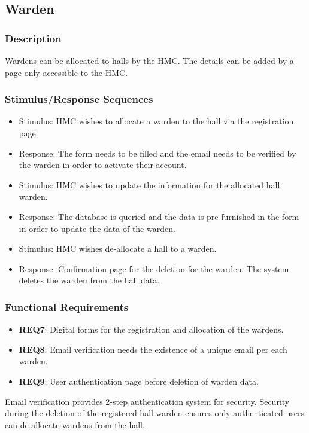\documentclass{scrreprt}
\begin{document}
\subsection{Warden}
\subsubsection{Description}
Wardens can be allocated to halls by the HMC. The details can be added by a page only accessible to the HMC.
\subsubsection{Stimulus/Response Sequences}
\begin{itemize}
    \item Stimulus: HMC wishes to allocate a warden to the hall via the registration page.
    \item Response: The form needs to be filled and the email needs to be verified by the warden in order to activate their account.
\end{itemize}

\begin{itemize}
    \item Stimulus: HMC wishes to update the information for the allocated hall warden.
    \item Response: The database is queried and the data is pre-furnished in the form in order to update the data of the warden.
\end{itemize}

\begin{itemize}
    \item Stimulus: HMC wishes de-allocate a hall to a warden.
    \item Response: Confirmation page for the deletion for the warden. The system deletes the warden from the hall data.
\end{itemize}

\subsubsection{Functional Requirements}
\begin{itemize}
    \item \textbf{REQ7}: Digital forms for the registration and allocation of the wardens.
    \item \textbf{REQ8}: Email verification needs the existence of a unique email per each warden.
    \item \textbf{REQ9}: User authentication page before deletion of warden data.
\end{itemize}
Email verification provides 2-step authentication system for security. Security during the deletion of the registered hall warden ensures only authenticated users can de-allocate wardens from the hall.
\end{document}
